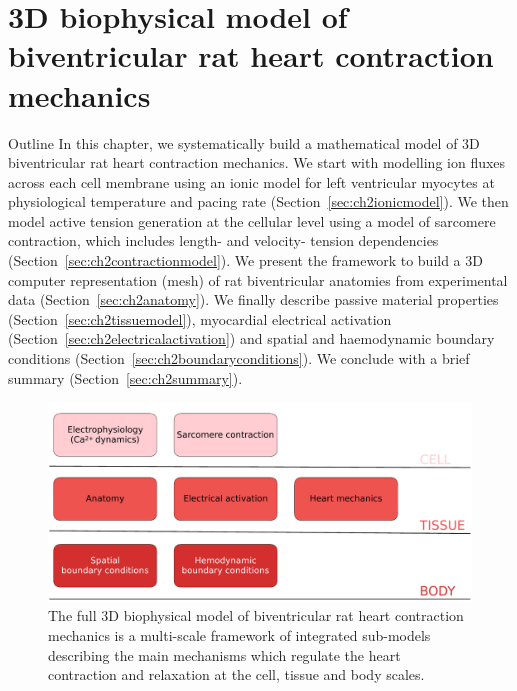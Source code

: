 \chapter{3D biophysical model of biventricular rat heart contraction 
mechanics}\label{cha:chapter02}
%
%
%
\begin{remark}{Outline}
    In this chapter, we systematically build a mathematical model of $3$D biventricular rat heart contraction mechanics. We start with modelling ion fluxes across each cell membrane using an ionic model for left ventricular myocytes at physiological temperature and pacing rate (Section~\ref{sec:ch2ionicmodel}). We then model active tension generation at the cellular level using a model of sarcomere contraction, which includes length- and velocity- tension dependencies (Section~\ref{sec:ch2contractionmodel}). We present the framework to build a $3$D computer representation (mesh) of rat biventricular anatomies from experimental data (Section~\ref{sec:ch2anatomy}). We finally describe passive material properties (Section~\ref{sec:ch2tissuemodel}), myocardial electrical activation (Section~\ref{sec:ch2electricalactivation}) and spatial and haemodynamic boundary conditions (Section~\ref{sec:ch2boundaryconditions}). We conclude with a brief summary (Section~\ref{sec:ch2summary}).
\end{remark}

\begin{figure}[!ht]
    \myfloatalign
    \includegraphics[width=\textwidth]{figures/chapter02/methods_schematic.pdf}
    \caption{The full $3$D biophysical model of biventricular rat heart contraction mechanics is a multi-scale framework of integrated sub-models describing the main mechanisms which regulate the heart contraction and relaxation at the cell, tissue and body scales.}
    \label{fig:methodssummaryinscale}
\end{figure}


